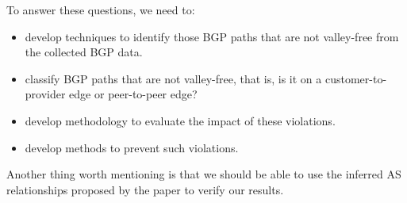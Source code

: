 \documentclass[11pt]{article}
\begin{document}
\vspace{0.5em}
To answer these questions, we need to:
\vspace{0.5em}
\begin{itemize}[nolistsep]
\item develop techniques to identify those BGP paths that are not
  valley-free from the collected BGP data. 
\item classify BGP paths that are not valley-free, that is, is it on
  a customer-to-provider edge or peer-to-peer edge?
\item develop methodology to evaluate the impact of these violations.
\item develop methods to prevent such violations.
\end{itemize}

\vspace{0.5em}
Another thing worth mentioning is that we should be able to use the
inferred AS relationships proposed by the paper to verify our results.
\end{document}
